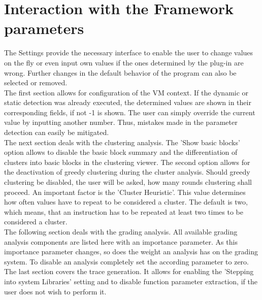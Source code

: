 \documentclass[10pt,twoside,a4paper,bibliography=totoc]{scrbook}
\begin{document}
\section{Interaction with the Framework parameters}
\label{sec3:settings}
The Settings provide the necessary interface to enable the user to change values on the fly or even input own values if the ones determined by the plug-in are wrong. Further changes in the default behavior of the program can also be selected or removed.\\
The first section allows for configuration of the VM context. If the dynamic or static detection was already executed, the determined values are shown in their corresponding fields, if not -1 is shown. The user can simply override the current value by inputting another number. Thus, mistakes made in the parameter detection can easily be mitigated.\\
The next section deals with the clustering analysis. The 'Show basic blocks' option allows to disable the basic block summary and the differentiation of clusters into basic blocks in the clustering viewer. 
The second option allows for the deactivation of greedy clustering during the cluster analysis. Should greedy clustering be disabled, the user will be asked, how many rounds clustering shall proceed.
An important factor is the 'Cluster Heuristic'. 
This value determines how often values have to repeat to be considered a cluster. 
The default is two, which means, that an instruction has to be repeated at least two times to be considered a cluster.\\
The following section deals with the grading analysis. All available grading analysis components are listed here with an importance parameter. 
As this importance parameter changes, so does the weight an analysis has on the grading system. 
To disable an analysis completely set the according parameter to zero.\\
The last section covers the trace generation. It allows for enabling the 'Stepping into system Libraries' setting and to disable function parameter extraction, if the user does not wish to perform it. 
\end{document}
